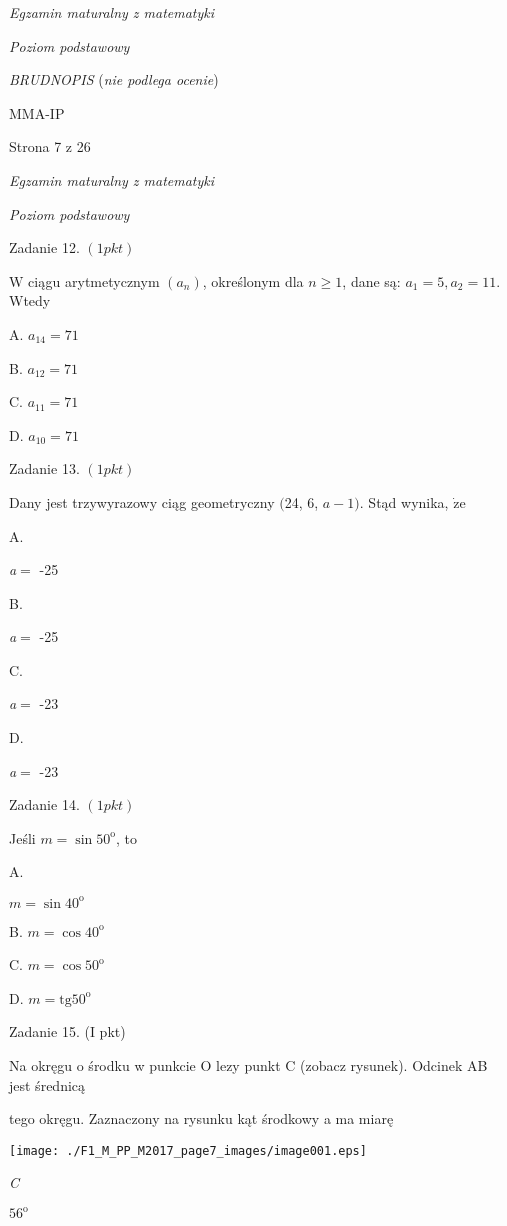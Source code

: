 \documentclass[a4paper,12pt]{article}
\begin{document}
{\it Egzamin maturalny z matematyki}

{\it Poziom podstawowy}

{\it BRUDNOPIS} ({\it nie podlega ocenie})

MMA-IP

Strona 7 z 26





{\it Egzamin maturalny z matematyki}

{\it Poziom podstawowy}

Zadanie 12. $(1pkt)$

$\mathrm{W}$ ciągu arytmetycznym $(a_{n})$, określonym dla $n\geq 1$, dane są: $a_{1}=5, a_{2}=11$. Wtedy

A. $a_{14}=71$

B. $a_{12}=71$

C. $a_{11}=71$

D. $a_{10}=71$

Zadanie 13. $(1pkt)$

Dany jest trzywyrazowy ciąg geometryczny $($24, 6, $a-1)$. Stąd wynika, $\dot{\mathrm{z}}\mathrm{e}$

A.

{\it a}$=$ -25

B.

{\it a}$=$ -25

C.

{\it a}$=$ -23

D.

{\it a}$=$ -23

Zadanie 14. $(1pkt)$

Jeśli $m=\sin 50^{\mathrm{o}}$, to

A.

$m=\sin 40^{\mathrm{o}}$

B. $m=\cos 40^{\mathrm{o}}$

C. $m=\cos 50^{\mathrm{o}}$

D. $m=\mathrm{t}\mathrm{g}50^{\mathrm{o}}$

Zadanie 15. (I pkt)

Na okręgu o środku w punkcie O lezy punkt C (zobacz rysunek). Odcinek AB jest średnicą

tego okręgu. Zaznaczony na rysunku kąt środkowy a ma miarę
\begin{center}
\texttt{[image: ./F1\_M\_PP\_M2017\_page7\_images/image001.eps]}
\end{center}
{\it C}

$56^{\mathrm{o}}$
\end{document}
